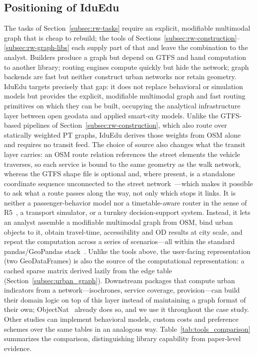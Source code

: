 \documentclass[smartcities,article,submit,moreauthors]{Definitions/mdpi}
\begin{document}
    \subsection{Positioning of IduEdu}
    \label{subsec:rw-positioning}

    The tasks of Section~\ref{subsec:rw-tasks} require an explicit, modifiable multimodal graph that is
    cheap to rebuild; the tools of
    Sections~\ref{subsec:rw-construction}--\ref{subsec:rw-graph-libs} each supply part of that and
    leave the combination to the analyst.
    Builders produce a graph but depend on GTFS and hand computation to another library; routing
    engines compute quickly but hide the network; graph backends are fast but neither construct urban
    networks nor retain geometry.
    IduEdu targets precisely that gap: it does not replace behavioral or simulation models but provides
    the explicit, modifiable multimodal graph and fast routing primitives on which they can be built,
    occupying the analytical infrastructure layer between open geodata and applied smart-city models.
    Unlike the GTFS-based pipelines of Section~\ref{subsec:rw-construction}, which also route over
    statically weighted PT graphs, IduEdu derives those weights from OSM alone and requires no transit
    feed.
    The choice of source also changes what the transit layer carries: an OSM route relation references
    the street elements the vehicle traverses, so each service is bound to the same geometry as the
    walk network, whereas the GTFS shape file is optional and, where present, is a standalone
    coordinate sequence unconnected to the street network~\cite{gtfs_spec}---which makes it possible to
    ask what a route passes along the way, not only which stops it links.
    It is neither a passenger-behavior model nor a timetable-aware router in the sense of
    R5~\cite{pereira2021r5r}, a transport simulator, or a turnkey decision-support system.
    Instead, it lets an analyst assemble a modifiable multimodal graph from OSM, bind urban objects to
    it, obtain travel-time, accessibility and OD results at city scale, and repeat the computation
    across a series of scenarios---all within the standard pandas/GeoPandas stack~\cite{geopandas}.
    Unlike the tools above, the user-facing representation (two GeoDataFrames) is also the source of the
    computational representation: a cached sparse matrix derived lazily from the edge table
    (Section~\ref{subsec:urban_graph}).
    Downstream packages that compute urban indicators from a network---isochrones, service coverage,
    provision---can build their domain logic on top of this layer instead of maintaining a graph
    format of their own; ObjectNat~\cite{objectnat_docs} already does so, and we use it throughout the
    case study.
    Other studies can implement behavioral models, custom costs and preference schemes over the same
    tables in an analogous way.
    Table~\ref{tab:tools_comparison} summarizes the comparison, distinguishing library capability from
    paper-level evidence.
\end{document}
